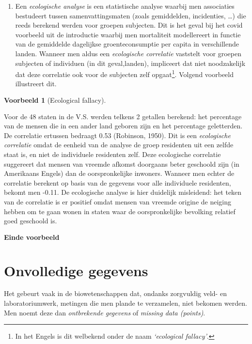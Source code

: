 \documentclass[
  12pt,dutch,coursenotes]{book}
\theoremstyle{definition}
\theoremstyle{definition}
\newtheorem{example}{Voorbeeld}[chapter]
\theoremstyle{definition}
\theoremstyle{remark}
\begin{document}
\begin{enumerate}
\item
  Een \emph{ecologische analyse} is een statistische analyse waarbij men associaties bestudeert tussen samenvattingsmaten (zoals gemiddelden, incidenties, \ldots) die reeds berekend werden voor groepen subjecten. Dit is het geval bij het covid voorbeeld uit de introductie waarbij men mortaliteit modellereert in functie van de gemiddelde dagelijkse groenteconsumptie per capita in verschillende landen. Wanneer men aldus een \emph{ecologische correlatie} vaststelt voor groepen subjecten of individuen (in dit geval,landen), impliceert dat niet noodzakelijk dat deze correlatie ook voor de subjecten zelf opgaat\footnote{In het Engels is dit welbekend onder de naam \emph{`ecological fallacy'}.}. Volgend voorbeeld illustreert dit.
\end{enumerate}

\begin{example}[Ecological fallacy]
\protect\hypertarget{exm:unnamed-chunk-126}{}{\label{exm:unnamed-chunk-126} \iffalse (Ecological fallacy) \fi{} }
\end{example}

Voor de 48 staten in de V.S. werden telkens 2 getallen
berekend: het percentage van de mensen die in een ander land geboren zijn en het percentage geletterden. De correlatie ertussen bedraagt 0.53 (Robinson, 1950). Dit is een \emph{ecologische correlatie} omdat de eenheid van de analyse de groep residenten uit een zelfde staat is, en niet de individuele residenten zelf. Deze ecologische correlatie suggereert dat mensen van vreemde afkomst doorgaans beter geschoold zijn (in Amerikaans Engels) dan de oorspronkelijke inwoners. Wanneer men echter de correlatie berekent op basis
van de gegevens voor alle individuele residenten, bekomt men -0.11. De ecologische analyse is hier duidelijk misleidend: het teken van de correlatie is er positief omdat mensen van vreemde origine de neiging hebben om te gaan wonen in staten waar de oorspronkelijke bevolking relatief goed geschoold is.

\textbf{Einde voorbeeld}

\hypertarget{sec:missing}{%
\section{Onvolledige gegevens}\label{sec:missing}}

Het gebeurt vaak in de biowetenschappen dat, ondanks zorgvuldig veld- en laboratoriumwerk, metingen die men plande te verzamelen, niet bekomen werden. Men noemt deze dan \emph{ontbrekende gegevens} of \emph{missing data (points)}.
\end{document}
